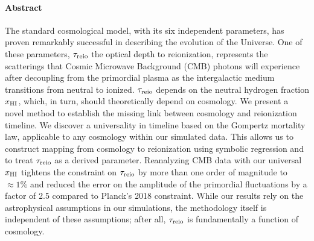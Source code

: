 

\paragraph{\large Abstract}

The standard cosmological model, with its six independent parameters,
has proven remarkably successful in describing the evolution of the
Universe.
One of these parameters, $\tau_{\mathrm{reio}}$ the optical depth to reionization,
represents the scatterings that Cosmic Microwave Background (CMB)
photons will experience after decoupling from the primordial plasma as
the intergalactic medium transitions from neutral to ionized.
$\tau_{\mathrm{reio}}$ depends on the neutral hydrogen fraction $x_{\mathrm{HI}}$, which, in
turn, should theoretically depend on cosmology.
We present a novel method to establish the missing link between
cosmology and reionization timeline.
We discover a universality in timeline based on the Gompertz mortality
law, applicable to any cosmology within our simulated data. 
This allows us to construct mapping from cosmology to reionization using
symbolic regression and to treat $\tau_{\mathrm{reio}}$ as a derived parameter.
Reanalyzing CMB data with our universal $x_{\mathrm{HI}}$ tightens the constraint
on $\tau_{\mathrm{reio}}$ by more than one order of magnitude to $\approx 1\%$ and
reduced the error on the amplitude of the primordial fluctuations by a
factor of 2.5 compared to Planck's 2018 constraint.
While our results rely on the astrophysical assumptions in our
simulations, the methodology itself is independent of these assumptions;
after all, $\tau_{\mathrm{reio}}$ is fundamentally a function of cosmology.
